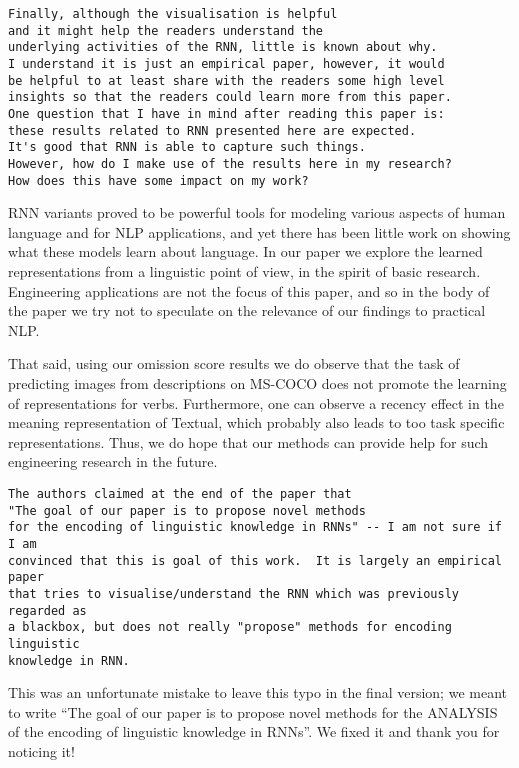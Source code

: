 \documentclass{article}
\begin{document}
\begin{verbatim}
Finally, although the visualisation is helpful 
and it might help the readers understand the 
underlying activities of the RNN, little is known about why. 
I understand it is just an empirical paper, however, it would 
be helpful to at least share with the readers some high level 
insights so that the readers could learn more from this paper. 
One question that I have in mind after reading this paper is: 
these results related to RNN presented here are expected. 
It's good that RNN is able to capture such things. 
However, how do I make use of the results here in my research? 
How does this have some impact on my work?
\end{verbatim}

RNN variants proved to be powerful tools for modeling various aspects of human
language and for NLP applications, and yet there has been little work on showing 
what these models learn about language. In our paper we explore the 
learned representations from a linguistic point of view, in the spirit
of basic research.  
Engineering applications are not the focus of this paper, and so in
the body of the paper we try not to speculate on the relevance of our
findings to practical NLP.

That said, using our omission score results
we do observe that the task of predicting images 
from descriptions on MS-COCO does
not promote the learning of representations for verbs. 
Furthermore, one can observe a recency
effect in the meaning representation of {\sc Textual}, 
which probably also leads to too task specific representations. 
Thus, we do hope that our methods can provide help for such
engineering research in the future.


\begin{verbatim}
The authors claimed at the end of the paper that 
"The goal of our paper is to propose novel methods
for the encoding of linguistic knowledge in RNNs" -- I am not sure if I am
convinced that this is goal of this work.  It is largely an empirical paper
that tries to visualise/understand the RNN which was previously regarded as
a blackbox, but does not really "propose" methods for encoding linguistic
knowledge in RNN.
\end{verbatim}

This was an unfortunate mistake to leave this typo in the final version;
we meant to write ``The goal of our paper is to propose novel methods
for the ANALYSIS of the encoding of linguistic knowledge in RNNs''. We fixed it and 
thank you for noticing it!
\end{document}
